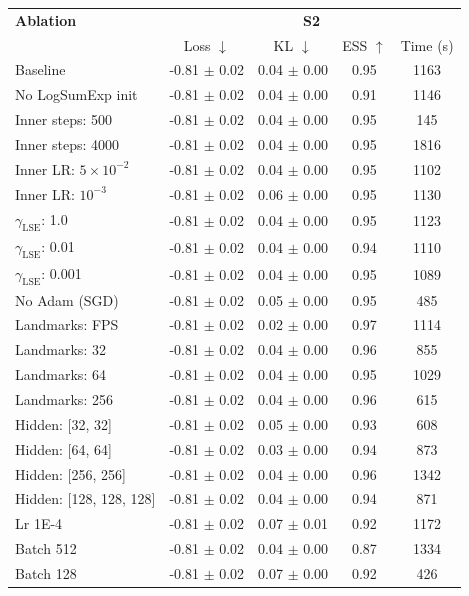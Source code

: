 \begin{tabular}{lcccc}
\toprule
\textbf{Ablation} & \multicolumn{4}{c}{\textbf{S2}} \\
 & Loss $\downarrow$ & KL $\downarrow$ & ESS $\uparrow$ & Time (s) \\
\midrule
Baseline & -0.81 $\pm$ 0.02 & 0.04 $\pm$ 0.00 & 0.95 & 1163 \\
No LogSumExp init & -0.81 $\pm$ 0.02 & 0.04 $\pm$ 0.00 & 0.91 & 1146 \\
Inner steps: 500 & -0.81 $\pm$ 0.02 & 0.04 $\pm$ 0.00 & 0.95 & 145 \\
Inner steps: 4000 & -0.81 $\pm$ 0.02 & 0.04 $\pm$ 0.00 & 0.95 & 1816 \\
Inner LR: $5 \times 10^{-2}$ & -0.81 $\pm$ 0.02 & 0.04 $\pm$ 0.00 & 0.95 & 1102 \\
Inner LR: $10^{-3}$ & -0.81 $\pm$ 0.02 & 0.06 $\pm$ 0.00 & 0.95 & 1130 \\
$\gamma_{\text{LSE}}$: 1.0 & -0.81 $\pm$ 0.02 & 0.04 $\pm$ 0.00 & 0.95 & 1123 \\
$\gamma_{\text{LSE}}$: 0.01 & -0.81 $\pm$ 0.02 & 0.04 $\pm$ 0.00 & 0.94 & 1110 \\
$\gamma_{\text{LSE}}$: 0.001 & -0.81 $\pm$ 0.02 & 0.04 $\pm$ 0.00 & 0.95 & 1089 \\
No Adam (SGD) & -0.81 $\pm$ 0.02 & 0.05 $\pm$ 0.00 & 0.95 & 485 \\
Landmarks: FPS & -0.81 $\pm$ 0.02 & 0.02 $\pm$ 0.00 & 0.97 & 1114 \\
Landmarks: 32 & -0.81 $\pm$ 0.02 & 0.04 $\pm$ 0.00 & 0.96 & 855 \\
Landmarks: 64 & -0.81 $\pm$ 0.02 & 0.04 $\pm$ 0.00 & 0.95 & 1029 \\
Landmarks: 256 & -0.81 $\pm$ 0.02 & 0.04 $\pm$ 0.00 & 0.96 & 615 \\
Hidden: [32, 32] & -0.81 $\pm$ 0.02 & 0.05 $\pm$ 0.00 & 0.93 & 608 \\
Hidden: [64, 64] & -0.81 $\pm$ 0.02 & 0.03 $\pm$ 0.00 & 0.94 & 873 \\
Hidden: [256, 256] & -0.81 $\pm$ 0.02 & 0.04 $\pm$ 0.00 & 0.96 & 1342 \\
Hidden: [128, 128, 128] & -0.81 $\pm$ 0.02 & 0.04 $\pm$ 0.00 & 0.94 & 871 \\
Lr 1E-4 & -0.81 $\pm$ 0.02 & 0.07 $\pm$ 0.01 & 0.92 & 1172 \\
Batch 512 & -0.81 $\pm$ 0.02 & 0.04 $\pm$ 0.00 & 0.87 & 1334 \\
Batch 128 & -0.81 $\pm$ 0.02 & 0.07 $\pm$ 0.00 & 0.92 & 426 \\
\bottomrule
\end{tabular}